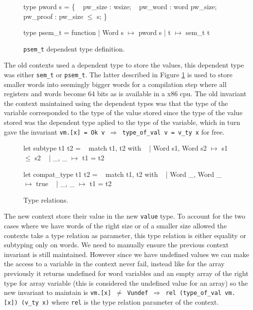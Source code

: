 \documentclass{article}
\begin{document}
\medskip

\begin{figure}
\obeylines\obeyspaces\ttfamily%
type pword s = \{
~ pw\_size  : wsize;
~ pw\_word  : word pw\_size;
~ pw\_proof : pw\_size \(\leq\) s;
\}

type psem\_t = function
| Word s \(\mapsto\) pword s
| t      \(\mapsto\) sem\_t t
\normalfont%
\caption{\texttt{psem\_t} dependent type definition.}\label{fig:psemt}
\end{figure}

The old contexts used a dependent type to store the values, this dependent type
was either \texttt{sem\_t} or \texttt{psem\_t}. The latter described in Figure
\ref{fig:psemt} is used to store smaller words into seemingly bigger words for
a compilation step where all registers and words become 64 bits as is available
in a x86 cpu. The old invariant the context maintained using the dependent types
was that the type of the variable corresponded to the type of the value stored
since the type of the value stored was the dependent type aplied to the type of
the variable, which in turn gave the invariant
\texttt{vm.[x] = Ok v \(\Longrightarrow\) type\_of\_val v = v\_ty x} for free.

\begin{figure}[t]
\obeylines\obeyspaces\ttfamily%
let subtype t1 t2 =
~ match t1, t2 with
~ | Word s1, Word s2 \(\mapsto\) s1 \(\leq\) s2
~ | \_,       \_       \(\mapsto\) t1 = t2

let compat\_type t1 t2 =
~ match t1, t2 with
~ | Word \_, Word \_ \(\mapsto\) true
~ | \_,      \_      \(\mapsto\) t1 = t2
\normalfont%
\caption{Type relations.}
\end{figure}

The new context store their value in the new \texttt{value} type. To account for
the two cases where we have words of the right size or of a smaller size allowed
the contexts take a type relation as parameter, this type relation is either
equality or subtyping only on words. We need to manually ensure the previous
context invariant is still maintained. However since we have undefined values we
can make the access to a variable in the context never fail, instead like for
the array previously it returns undefined for word variables and an empty array
of the right type for array variable (this is considered the undefined value for
an array) so the new invariant to maintain is
\texttt{vm.[x] \(\neq\) Vundef \(\Longrightarrow\) rel (type\_of\_val vm.[x]) (v\_ty x)}
where \texttt{rel} is the type relation parameter of the context.
\end{document}
